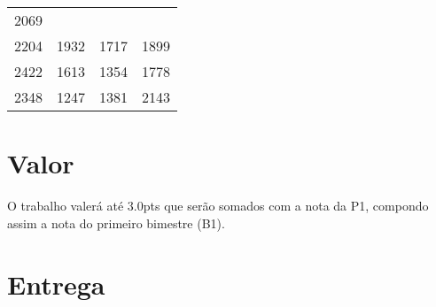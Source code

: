 \documentclass[a4paper]{article}
\begin{document}
\begin{longtable}[c]{@{}cccc@{}}
\begin{minipage}[t]{0.06\columnwidth}
2069
\strut\end{minipage}\tabularnewline
\begin{minipage}[t]{0.06\columnwidth}\centering\strut
2204
\strut\end{minipage} &
\begin{minipage}[t]{0.06\columnwidth}\centering\strut
1932
\strut\end{minipage} &
\begin{minipage}[t]{0.06\columnwidth}\centering\strut
1717
\strut\end{minipage} &
\begin{minipage}[t]{0.06\columnwidth}\centering\strut
1899
\strut\end{minipage}\tabularnewline
\begin{minipage}[t]{0.06\columnwidth}\centering\strut
2422
\strut\end{minipage} &
\begin{minipage}[t]{0.06\columnwidth}\centering\strut
1613
\strut\end{minipage} &
\begin{minipage}[t]{0.06\columnwidth}\centering\strut
1354
\strut\end{minipage} &
\begin{minipage}[t]{0.06\columnwidth}\centering\strut
1778
\strut\end{minipage}\tabularnewline
\begin{minipage}[t]{0.06\columnwidth}\centering\strut
2348
\strut\end{minipage} &
\begin{minipage}[t]{0.06\columnwidth}\centering\strut
1247
\strut\end{minipage} &
\begin{minipage}[t]{0.06\columnwidth}\centering\strut
1381
\strut\end{minipage} &
\begin{minipage}[t]{0.06\columnwidth}\centering\strut
2143
\strut\end{minipage}\tabularnewline
\bottomrule
\end{longtable}

\section{Valor}
O trabalho valerá até $3.0$pts que serão somados com a nota da P1, compondo assim a nota do primeiro bimestre (B1).

\section{Entrega}
\end{document}
